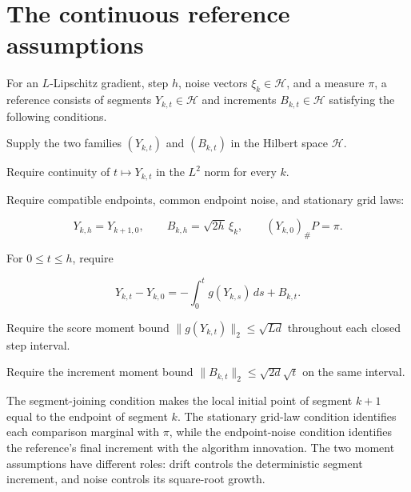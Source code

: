 \documentclass[11pt,a4paper]{article}
\begin{document}
\section{\texorpdfstring{The continuous reference assumptions}{The continuous reference assumptions}}


For an \(L\)-Lipschitz gradient, step \(h\), noise vectors \(\xi_k\in\mathcal H\), and a measure \(\pi\), a reference consists of segments \(Y_{k,t}\in\mathcal H\) and increments \(B_{k,t}\in\mathcal H\) satisfying the following conditions.



Supply the two families \((Y_{k,t})\) and \((B_{k,t})\) in the Hilbert space \(\mathcal H\).



Require continuity of \(t\mapsto Y_{k,t}\) in the \(L^2\) norm for every \(k\).



Require compatible endpoints, common endpoint noise, and stationary grid laws:

\[Y_{k,h}=Y_{k+1,0},\qquad B_{k,h}=\sqrt{2h}\,\xi_k,\qquad(Y_{k,0})_\#P=\pi.\]

For \(0\le t\le h\), require

\[Y_{k,t}-Y_{k,0}=-\int_0^t g(Y_{k,s})\,ds+B_{k,t}.\]

Require the score moment bound \(\|g(Y_{k,t})\|_2\le\sqrt{Ld}\) throughout each closed step interval.



Require the increment moment bound \(\|B_{k,t}\|_2\le\sqrt{2d}\sqrt t\) on the same interval.



The segment-joining condition makes the local initial point of segment \(k+1\) equal to the endpoint of segment \(k\). The stationary grid-law condition identifies each comparison marginal with \(\pi\), while the endpoint-noise condition identifies the reference's final increment with the algorithm innovation. The two moment assumptions have different roles: drift controls the deterministic segment increment, and noise controls its square-root growth.
\end{document}
